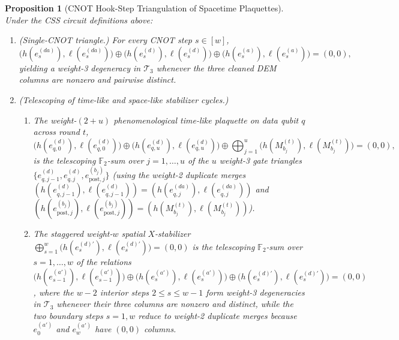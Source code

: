 \documentclass[12pt]{article}
\newtheorem{proposition}{Proposition}
\theoremstyle{definition}
\newcommand{\Ftwo}{\mathbb{F}_2}
\newcommand{\Tc}{\mathcal{T}_3}
\begin{document}
\begin{proposition}[CNOT Hook-Step Triangulation of Spacetime Plaquettes]\label{prop:hook_triangulation}
Under the CSS circuit definitions above:
\begin{enumerate}[label=(\alph*)]
  \item \emph{(Single-CNOT triangle.)} For every CNOT step $s \in [w]$,
    \begin{equation}\label{eq:tri_gate}
      \bigl(h(e^{(da)}_s), \ell(e^{(da)}_s)\bigr) \oplus \bigl(h(e^{(d)}_s), \ell(e^{(d)}_s)\bigr)
      \oplus \bigl(h(e^{(a)}_s), \ell(e^{(a)}_s)\bigr) = (0, 0),
    \end{equation}
    yielding a weight-3 degeneracy in $\Tc$ whenever the three cleaned DEM columns are nonzero and pairwise
    distinct.
  \item \emph{(Telescoping of time-like and space-like stabilizer cycles.)}
    \begin{enumerate}[label=(b\arabic*)]
      \item The weight-$(2 + u)$ phenomenological time-like plaquette on data qubit $q$ across round $t$,
        \[
          \bigl(h(e^{(d)}_{q, 0}), \ell(e^{(d)}_{q, 0})\bigr) \oplus
          \bigl(h(e^{(d)}_{q, u}), \ell(e^{(d)}_{q, u})\bigr) \oplus
          \bigoplus_{j=1}^u \bigl(h(M_{b_j}^{(t)}), \ell(M_{b_j}^{(t)})\bigr) = (0, 0),
        \]
        is the telescoping $\Ftwo$-sum over $j = 1, \dots, u$ of the $u$ weight-3 gate triangles
        $\{e^{(d)}_{q, j-1}, e^{(d)}_{q, j}, e^{(b_j)}_{\mathrm{post}, j}\}$ (using the weight-2 duplicate merges
        $(h(e^{(d)}_{q, j-1}), \ell(e^{(d)}_{q, j-1})) = (h(e^{(da)}_{q, j}), \ell(e^{(da)}_{q, j}))$ and
        $(h(e^{(b_j)}_{\mathrm{post}, j}), \ell(e^{(b_j)}_{\mathrm{post}, j})) = (h(M_{b_j}^{(t)}),
        \ell(M_{b_j}^{(t)}))$).
      \item The staggered weight-$w$ spatial $X$-stabilizer $\bigoplus_{s=1}^w \bigl(h(e^{(d)'}_s),
        \ell(e^{(d)'}_s)\bigr) = (0, 0)$ is the telescoping $\Ftwo$-sum over $s = 1, \dots, w$ of the relations
        $\bigl(h(e^{(a')}_{s-1}), \ell(e^{(a')}_{s-1})\bigr) \oplus \bigl(h(e^{(a')}_s), \ell(e^{(a')}_s)\bigr)
        \oplus \bigl(h(e^{(d)'}_s), \ell(e^{(d)'}_s)\bigr) = (0, 0)$, where the $w - 2$ interior steps $2 \le s \le
        w - 1$ form weight-3 degeneracies in $\Tc$ whenever their three columns are nonzero and distinct, while the
        two boundary steps $s = 1, w$ reduce to weight-2 duplicate merges because $e^{(a')}_0$ and $e^{(a')}_w$
        have $(0, 0)$ columns.
    \end{enumerate}
\end{enumerate}
\end{proposition}
\end{document}

